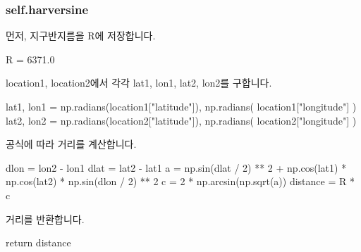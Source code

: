 \documentclass{oblivoir}
\begin{document}
  \subsubsection{self.harversine}
  먼저, 지구반지름을 R에 저장합니다.
  \begin{python}[label={GPS_feature_43}]
    R = 6371.0
  \end{python}
  location1, location2에서 각각 lat1, lon1, lat2, lon2를 구합니다.
  \begin{python}[label={GPS_feature_44}]
    lat1, lon1 = np.radians(location1["latitude"]), np.radians(
        location1["longitude"]
    )
    lat2, lon2 = np.radians(location2["latitude"]), np.radians(
        location2["longitude"]
    )
  \end{python}
  공식에 따라 거리를 계산합니다.
  \begin{python}[label={GPS_feature_45}]
    dlon = lon2 - lon1
    dlat = lat2 - lat1
    a = np.sin(dlat / 2) ** 2 + np.cos(lat1) * np.cos(lat2) * np.sin(dlon / 2) ** 2
    c = 2 * np.arcsin(np.sqrt(a))
    distance = R * c
  \end{python}
  거리를 반환합니다.
  \begin{python}[label={GPS_feature_46}]
    return distance
  \end{python}
\end{document}
